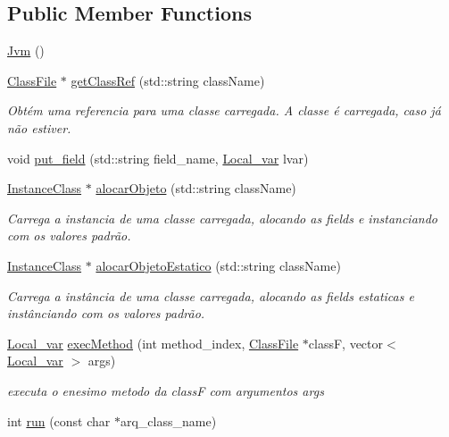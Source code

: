 \subsection*{Public Member Functions}
\begin{DoxyCompactItemize}
\item 
\hyperlink{classJvm_a2bbdf6ed1c101825a440bd38dfa54a5a}{Jvm} ()
\item 
\hyperlink{classClassFile}{Class\+File} $\ast$ \hyperlink{classJvm_a6c159c7b6eed436d26b95e4af9fdca87}{get\+Class\+Ref} (std\+::string class\+Name)
\begin{DoxyCompactList}\small\item\em Obtém uma referencia para uma classe carregada. A classe é carregada, caso já não estiver. \end{DoxyCompactList}\item 
void \hyperlink{classJvm_a828e1608fdac86ee26615021e2b63a80}{put\+\_\+field} (std\+::string field\+\_\+name, \hyperlink{classLocal__var}{Local\+\_\+var} lvar)
\item 
\hyperlink{classInstanceClass}{Instance\+Class} $\ast$ \hyperlink{classJvm_a854b6ba06d1a9187ec7699861c57e3a3}{alocar\+Objeto} (std\+::string class\+Name)
\begin{DoxyCompactList}\small\item\em Carrega a instancia de uma classe carregada, alocando as fields e instanciando com os valores padrão. \end{DoxyCompactList}\item 
\hyperlink{classInstanceClass}{Instance\+Class} $\ast$ \hyperlink{classJvm_a03ab322c195c906da1da0455a4ef794f}{alocar\+Objeto\+Estatico} (std\+::string class\+Name)
\begin{DoxyCompactList}\small\item\em Carrega a instância de uma classe carregada, alocando as fields estaticas e instânciando com os valores padrão. \end{DoxyCompactList}\item 
\hyperlink{classLocal__var}{Local\+\_\+var} \hyperlink{classJvm_a53fd738b23dd40a98de0a6abec78aa23}{exec\+Method} (int method\+\_\+index, \hyperlink{classClassFile}{Class\+File} $\ast$class\+F, vector$<$ \hyperlink{classLocal__var}{Local\+\_\+var} $>$ args)
\begin{DoxyCompactList}\small\item\em executa o enesimo metodo da class\+F com argumentos args \end{DoxyCompactList}\item 
int \hyperlink{classJvm_ac7b36cf9d42be5f4e9fbd1e49f4565d3}{run} (const char $\ast$arq\+\_\+class\+\_\+name)
\end{DoxyCompactItemize}

